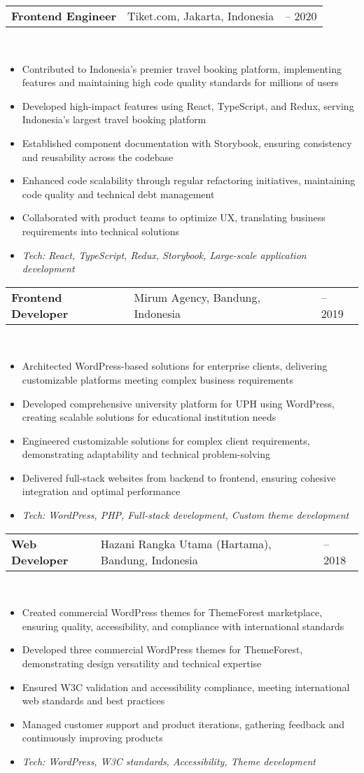 \documentclass[a4paper, 11pt]{article}
\newcommand{\resumeItem}[1]{
  \item\small{
    {#1 \vspace{-2pt}}
  }
}
\newcommand{\resumeSubheading}[4]{
  \vspace{-2pt}\item
    \begin{tabularx}{0.987\textwidth}[t]{
  >{\raggedright\arraybackslash}X
  >{\centering\arraybackslash}X
  >{\raggedleft\arraybackslash}X }
      \textbf{#1} & #2 & #3 \\
    \end{tabularx}
    \textit{\small#4}\\
    \vspace{-7pt}
}
\newcommand{\resumeItemListStart}{\begin{itemize}[leftmargin=0.22in]}
\newcommand{\resumeItemListEnd}{\end{itemize}\vspace{-20pt}}
\begin{document}
        \resumeSubheading
            {Frontend Engineer}{Tiket.com, Jakarta, Indonesia}{2019 -- 2020}{}
            \resumeItemListStart
                \resumeItem{Contributed to Indonesia's premier travel booking platform, implementing features and maintaining high code quality standards for millions of users}
                \resumeItem{Developed high-impact features using React, TypeScript, and Redux, serving Indonesia's largest travel booking platform}
                \resumeItem{Established component documentation with Storybook, ensuring consistency and reusability across the codebase}
                \resumeItem{Enhanced code scalability through regular refactoring initiatives, maintaining code quality and technical debt management}
                \resumeItem{Collaborated with product teams to optimize UX, translating business requirements into technical solutions}
                \resumeItem{\textit{Tech: React, TypeScript, Redux, Storybook, Large-scale application development}}
            \resumeItemListEnd

        \resumeSubheading
            {Frontend Developer}{Mirum Agency, Bandung, Indonesia}{2018 -- 2019}{}
            \resumeItemListStart
                \resumeItem{Architected WordPress-based solutions for enterprise clients, delivering customizable platforms meeting complex business requirements}
                \resumeItem{Developed comprehensive university platform for UPH using WordPress, creating scalable solutions for educational institution needs}
                \resumeItem{Engineered customizable solutions for complex client requirements, demonstrating adaptability and technical problem-solving}
                \resumeItem{Delivered full-stack websites from backend to frontend, ensuring cohesive integration and optimal performance}
                \resumeItem{\textit{Tech: WordPress, PHP, Full-stack development, Custom theme development}}
            \resumeItemListEnd

        \resumeSubheading
            {Web Developer}{Hazani Rangka Utama (Hartama), Bandung, Indonesia}{2017 -- 2018}{}
            \resumeItemListStart
                \resumeItem{Created commercial WordPress themes for ThemeForest marketplace, ensuring quality, accessibility, and compliance with international standards}
                \resumeItem{Developed three commercial WordPress themes for ThemeForest, demonstrating design versatility and technical expertise}
                \resumeItem{Ensured W3C validation and accessibility compliance, meeting international web standards and best practices}
                \resumeItem{Managed customer support and product iterations, gathering feedback and continuously improving products}
                \resumeItem{\textit{Tech: WordPress, W3C standards, Accessibility, Theme development}}
            \resumeItemListEnd
\end{document}
